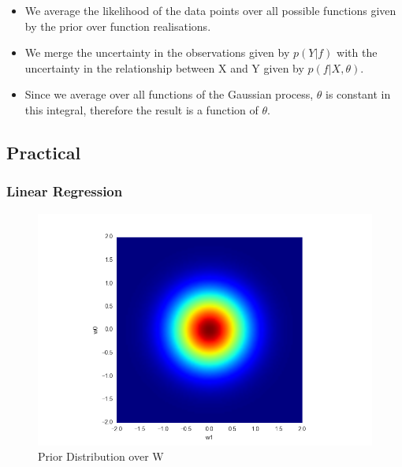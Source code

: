 \documentclass[a4paper,11pt]{article}
\theoremstyle{mytheor}
\begin{document}
\begin{itemize}
\item We average the likelihood of the data points over all possible functions given by the prior over function realisations.
\item We merge the uncertainty in the observations given by $p(Y|f)$ with the uncertainty in the relationship between X and Y given by $p(f|X,\theta)$.
\item Since we average over all functions of the Gaussian process, $\theta$ is constant in this integral, therefore the result is a function of $\theta$.
\end{itemize}

\subsection{Practical}
\subsubsection{Linear Regression}
\smallskip

\begin{figure}[h]
\centering
\includegraphics[scale =0.5]{prior} 
\caption{Prior Distribution over W}
\end{figure}
\end{document}
